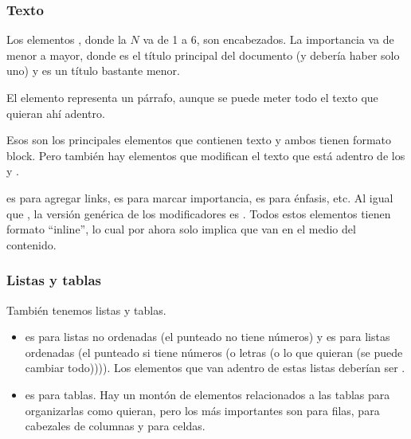 \begin{frame}[fragile]
    \frametitle{Texto}

    Los elementos , donde la $N$ va de 1 a 6, son encabezados. La importancia 
    va de menor a mayor, donde  es el título principal del documento (y debería 
    haber solo uno) y  es un título bastante menor.

    El elemento  representa un párrafo, aunque se puede meter todo el texto que 
    quieran ahí adentro.

    Esos son los principales elementos que contienen texto y ambos tienen formato block.
    Pero también hay elementos que modifican el texto que está adentro de los  
    y .

     es para agregar links,  es para marcar importancia, 
     es para énfasis, etc. Al igual que , la versión genérica 
    de los modificadores es . Todos estos elementos tienen formato 
    ``inline'', lo cual por ahora solo implica que van en el medio del contenido.

\end{frame}

\begin{frame}[fragile]
    \frametitle{Listas y tablas}

    También tenemos listas y tablas.

    \begin{itemize}
        \item {} es para listas no ordenadas (el punteado no tiene números) y 
               es para listas ordenadas (el punteado si tiene números (o letras
              (o lo que quieran (se puede cambiar todo)))). Los elementos que van adentro 
              de estas listas deberían ser .
        \item {} es para tablas. Hay un montón de elementos relacionados a las 
              tablas para organizarlas como quieran, pero los más importantes son 
               para filas,  para cabezales de columnas y 
              para celdas.
    \end{itemize}

\end{frame}

